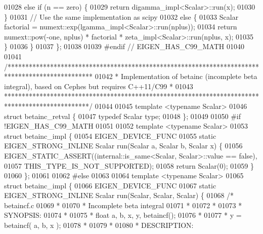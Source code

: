 \begin{DoxyCode}
01028         \textcolor{keywordflow}{else} \textcolor{keywordflow}{if} (n == zero) \{
01029             \textcolor{keywordflow}{return} digamma\_impl<Scalar>::run(x);
01030         \}
01031         \textcolor{comment}{// Use the same implementation as scipy}
01032         \textcolor{keywordflow}{else} \{
01033             Scalar factorial = numext::exp(lgamma\_impl<Scalar>::run(nplus));
01034             \textcolor{keywordflow}{return} numext::pow(-one, nplus) * factorial * zeta\_impl<Scalar>::run(nplus, x);
01035         \}
01036   \}
01037 \};
01038 
01039 \textcolor{preprocessor}{#endif  // EIGEN\_HAS\_C99\_MATH}
01040 
01041 \textcolor{comment}{/************************************************************************************************}
01042 \textcolor{comment}{ * Implementation of betainc (incomplete beta integral), based on Cephes but requires C++11/C99 *}
01043 \textcolor{comment}{ ************************************************************************************************/}
01044 
01045 \textcolor{keyword}{template} <\textcolor{keyword}{typename} Scalar>
01046 \textcolor{keyword}{struct }betainc\_retval \{
01047   \textcolor{keyword}{typedef} Scalar type;
01048 \};
01049 
01050 \textcolor{preprocessor}{#if !EIGEN\_HAS\_C99\_MATH}
01051 
01052 \textcolor{keyword}{template} <\textcolor{keyword}{typename} Scalar>
01053 \textcolor{keyword}{struct }betainc\_impl \{
01054   EIGEN\_DEVICE\_FUNC
01055   \textcolor{keyword}{static} EIGEN\_STRONG\_INLINE Scalar run(Scalar a, Scalar b, Scalar x) \{
01056     EIGEN\_STATIC\_ASSERT((internal::is\_same<Scalar, Scalar>::value == \textcolor{keyword}{false}),
01057                         THIS\_TYPE\_IS\_NOT\_SUPPORTED);
01058     \textcolor{keywordflow}{return} Scalar(0);
01059   \}
01060 \};
01061 
01062 \textcolor{preprocessor}{#else}
01063 
01064 \textcolor{keyword}{template} <\textcolor{keyword}{typename} Scalar>
01065 \textcolor{keyword}{struct }betainc\_impl \{
01066   EIGEN\_DEVICE\_FUNC
01067   \textcolor{keyword}{static} EIGEN\_STRONG\_INLINE Scalar run(Scalar, Scalar, Scalar) \{
01068     \textcolor{comment}{/*  betaincf.c}
01069 \textcolor{comment}{     *}
01070 \textcolor{comment}{     *  Incomplete beta integral}
01071 \textcolor{comment}{     *}
01072 \textcolor{comment}{     *}
01073 \textcolor{comment}{     * SYNOPSIS:}
01074 \textcolor{comment}{     *}
01075 \textcolor{comment}{     * float a, b, x, y, betaincf();}
01076 \textcolor{comment}{     *}
01077 \textcolor{comment}{     * y = betaincf( a, b, x );}
01078 \textcolor{comment}{     *}
01079 \textcolor{comment}{     *}
01080 \textcolor{comment}{     * DESCRIPTION:}

\end{DoxyCode}
